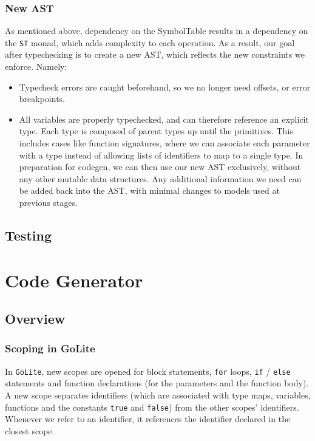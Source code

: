 \documentclass[11pt]{article}
\begin{document}
\subsubsection{New AST}
As mentioned above, dependency on the SymbolTable results in a
dependency on the \texttt{ST} monad, which adds complexity to each
operation.  As a result, our goal after typechecking is to create a
new AST, which reflects the new constraints we enforce.  Namely:
\begin{itemize}
\item Typecheck errors are caught beforehand, so we no longer need
  offsets, or error breakpoints.
\item All variables are properly typechecked, and can therefore
  reference an explicit type. Each type is composed of parent types up
  until the primitives.  This includes cases like function signatures,
  where we can associate each parameter with a type instead of
  allowing lists of identifiers to map to a single type.  In
  preparation for codegen, we can then use our new AST exclusively,
  without any other mutable data structures. Any additional
  information we need can be added back into the AST, with minimal
  changes to models used at previous stages.
\end{itemize}

\subsection{Testing} %

\section{Code Generator}
\subsection{Overview}
\subsubsection{Scoping in GoLite}
In \texttt{GoLite}, new scopes are opened for block statements,
\texttt{for} loops, \texttt{if} / \texttt{else} statements and
function declarations (for the parameters and the function body). A
new scope separates identifiers (which are associated with type maps,
variables, functions and the constants \texttt{true} and
\texttt{false}) from the other scopes' identifiers. Whenever we refer
to an identifier, it references the identifier declared in the closest
scope.
\end{document}

